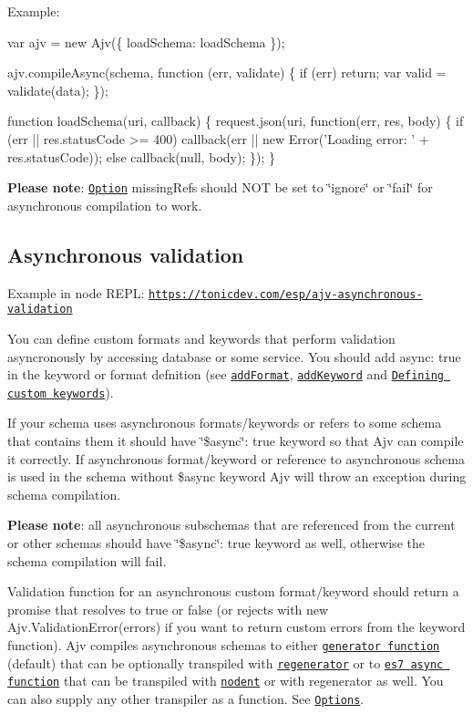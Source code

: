 Example\+:


\begin{DoxyCode}
var ajv = new Ajv(\{ loadSchema: loadSchema \});

ajv.compileAsync(schema, function (err, validate) \{
    if (err) return;
    var valid = validate(data);
\});

function loadSchema(uri, callback) \{
    request.json(uri, function(err, res, body) \{
        if (err || res.statusCode >= 400)
            callback(err || new Error('Loading error: ' + res.statusCode));
        else
            callback(null, body);
    \});
\}
\end{DoxyCode}


{\bfseries Please note}\+: \href{#options}{\tt Option} {\ttfamily missing\+Refs} should N\+OT be set to {\ttfamily \char`\"{}ignore\char`\"{}} or {\ttfamily \char`\"{}fail\char`\"{}} for asynchronous compilation to work.

\subsection*{Asynchronous validation}

Example in node R\+E\+PL\+: \href{https://tonicdev.com/esp/ajv-asynchronous-validation}{\tt https\+://tonicdev.\+com/esp/ajv-\/asynchronous-\/validation}

You can define custom formats and keywords that perform validation asyncronously by accessing database or some service. You should add {\ttfamily async\+: true} in the keyword or format defnition (see \href{#api-addformat}{\tt add\+Format}, \href{#api-addkeyword}{\tt add\+Keyword} and \href{#defining-custom-keywords}{\tt Defining custom keywords}).

If your schema uses asynchronous formats/keywords or refers to some schema that contains them it should have {\ttfamily \char`\"{}\$async\char`\"{}\+: true} keyword so that Ajv can compile it correctly. If asynchronous format/keyword or reference to asynchronous schema is used in the schema without {\ttfamily \$async} keyword Ajv will throw an exception during schema compilation.

{\bfseries Please note}\+: all asynchronous subschemas that are referenced from the current or other schemas should have {\ttfamily \char`\"{}\$async\char`\"{}\+: true} keyword as well, otherwise the schema compilation will fail.

Validation function for an asynchronous custom format/keyword should return a promise that resolves to {\ttfamily true} or {\ttfamily false} (or rejects with {\ttfamily new Ajv.\+Validation\+Error(errors)} if you want to return custom errors from the keyword function). Ajv compiles asynchronous schemas to either \href{https://developer.mozilla.org/en-US/docs/Web/JavaScript/Reference/Statements/function*}{\tt generator function} (default) that can be optionally transpiled with \href{https://github.com/facebook/regenerator}{\tt regenerator} or to \href{http://tc39.github.io/ecmascript-asyncawait/}{\tt es7 async function} that can be transpiled with \href{https://github.com/MatAtBread/nodent}{\tt nodent} or with regenerator as well. You can also supply any other transpiler as a function. See \href{#options}{\tt Options}.

